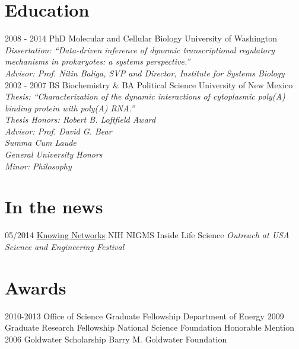 \documentclass[]{friggeri-cv}
\begin{document}
\section{Education}
\begin{entrylist}
  \entry
    {2008 - 2014}
    {PhD Molecular and Cellular Biology}
    {University of Washington}
    {\emph{Dissertation: ``Data-driven inference of dynamic transcriptional regulatory mechanisms in prokaryotes: a systems perspective.''}\\
    \emph{Advisor: Prof. Nitin Baliga, SVP and Director, Institute for Systems Biology}\\}
  \entry
    {2002 - 2007}
    {BS Biochemistry \& BA Political Science}
    {University of New Mexico}
    {\emph{Thesis: ``Characterization of the dynamic interactions of cytoplasmic poly(A) binding protein with poly(A) RNA.''}\\
    \textit{Thesis Honors: Robert B. Loftfield Award}\\
    \emph{Advisor: Prof. David G. Bear}\\
    \textit{Summa Cum Laude}\\
    \textit{General University Honors}\\
    \textit{Minor: Philosophy}}
\end{entrylist}
\newpage
\section{In the news}
\begin{entrylist}
  \entry
    {05/2014}
    {\href{http://publications.nigms.nih.gov/insidelifescience/knowing-networks.html}{Knowing Networks}}
    {NIH NIGMS Inside Life Science}
    {\emph{Outreach at USA Science and Engineering Festival}}
\end{entrylist}

\section{Awards}
\begin{entrylist}
  \entry
    {2010-2013}
    {Office of Science Graduate Fellowship}
    {Department of Energy}
    {}
  \entry
    {2009}
    {Graduate Research Fellowship}
    {National Science Foundation}
    {Honorable Mention}
   \entry
    {2006}
    {Goldwater Scholarship}
    {Barry M. Goldwater Foundation}
    {}
\end{entrylist}
\end{document}
